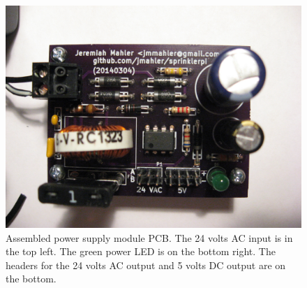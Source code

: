 \documentclass{article}
\begin{document}
\begin{figure}[hbp!]
\begin{center}
\includegraphics[scale=0.15,angle=0]{img/power_pcb-assembled-02.jpg}
\end{center}
\caption{Assembled power supply module PCB.
The 24 volts AC input is in the top left.
The green power LED is on the bottom right.
The headers for the 24 volts AC output and 5 volts DC
output are on the bottom.
}\label{fig:psm2}
\end{figure}
\end{document}
